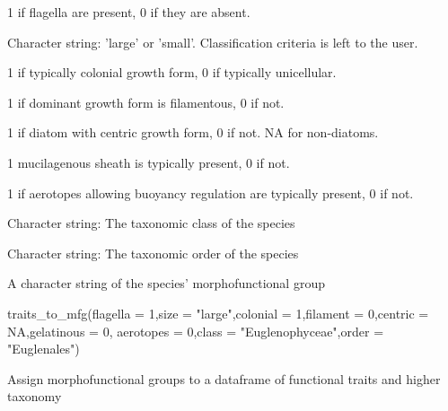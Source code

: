 \documentclass[a4paper]{book}
\begin{document}
%
\begin{Arguments}
\begin{ldescription}
\item[\code{flagella}] 1 if flagella are present, 0 if they are absent.

\item[\code{size}] Character string: 'large' or 'small'. Classification criteria is left to the user.

\item[\code{colonial}] 1 if typically colonial growth form, 0 if typically unicellular.

\item[\code{filament}] 1 if dominant growth form is filamentous, 0 if not.

\item[\code{centric}] 1 if diatom with centric growth form, 0 if not. NA for  non-diatoms.

\item[\code{gelatinous}] 1 mucilagenous sheath is typically present, 0 if not.

\item[\code{aerotopes}] 1 if aerotopes allowing buoyancy regulation are typically present, 0 if not.

\item[\code{class}] Character string: The taxonomic class of the species

\item[\code{order}] Character string: The taxonomic order of the species
\end{ldescription}
\end{Arguments}
%
\begin{Value}
A character string of the species' morphofunctional group
\end{Value}
%
\begin{Examples}
\begin{ExampleCode}
traits_to_mfg(flagella = 1,size = "large",colonial = 1,filament = 0,centric = NA,gelatinous = 0,
               aerotopes = 0,class = "Euglenophyceae",order = "Euglenales")
\end{ExampleCode}
\end{Examples}
%
\begin{Description}\relax
Assign morphofunctional groups to a dataframe of functional traits and higher taxonomy
\end{Description}
\end{document}
